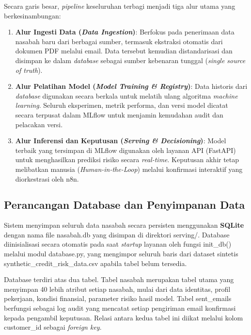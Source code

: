 Secara garis besar, \textit{pipeline} keseluruhan terbagi menjadi tiga alur utama yang berkesinambungan:
\begin{enumerate}
    \item \textbf{Alur Ingesti Data (\textit{Data Ingestion})}: Berfokus pada penerimaan data nasabah baru dari berbagai sumber, termasuk ekstraksi otomatis dari dokumen PDF melalui email. Data tersebut kemudian distandarisasi dan disimpan ke dalam \textit{database} sebagai sumber kebenaran tunggal (\textit{single source of truth}).
    \item \textbf{Alur Pelatihan Model (\textit{Model Training \& Registry})}: Data historis dari \textit{database} digunakan secara berkala untuk melatih ulang algoritma \textit{machine learning}. Seluruh eksperimen, metrik performa, dan versi model dicatat secara terpusat dalam MLflow untuk menjamin kemudahan audit dan pelacakan versi.
    \item \textbf{Alur Inferensi dan Keputusan (\textit{Serving \& Decisioning})}: Model terbaik yang tersimpan di MLflow digunakan oleh layanan API (FastAPI) untuk menghasilkan prediksi risiko secara \textit{real-time}. Keputusan akhir tetap melibatkan manusia (\textit{Human-in-the-Loop}) melalui konfirmasi interaktif yang diorkestrasi oleh n8n.
\end{enumerate}


\subsection{Perancangan Database dan Penyimpanan Data}

Sistem menyimpan seluruh data nasabah secara persisten menggunakan \textbf{SQLite} dengan nama file nasabah.db yang disimpan di direktori serving/. Database diinisialisasi secara otomatis pada saat \textit{startup} layanan oleh fungsi init\_db() melalui modul database.py, yang mengimpor seluruh baris dari dataset sintetis synthetic\_credit\_risk\_data.csv apabila tabel belum tersedia.

Database terdiri atas dua tabel. Tabel nasabah merupakan tabel utama yang menyimpan 40 lebih atribut setiap nasabah, mulai dari data identitas, profil pekerjaan, kondisi finansial, parameter risiko hasil model. Tabel sent\_emails berfungsi sebagai log audit yang mencatat setiap pengiriman email konfirmasi kepada pengambil keputusan. Relasi antara kedua tabel ini diikat melalui kolom customer\_id sebagai \textit{foreign key}.

